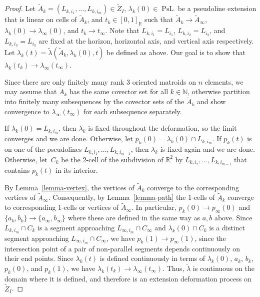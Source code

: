 \documentclass[11pt]{article}
\numberwithin{equation}{section}
\theoremstyle{remark}
\let\mb\mathbb
\DeclareMathOperator{\curves}{PsL}
\begin{document}
\begin{proof}
Let $\tilde A_k = (L_{k,i_1},\dots,L_{k,i_m}) \in \tilde Z_{I}$, $\lambda_k(0) \in \curves$ be a pseudoline extension that is linear on cells of $\tilde A_k$, and $t_k \in [0,1]_\mb{R}$ such that $\tilde A_k \to \tilde A_\infty$, $\lambda_k(0) \to \lambda_\infty(0)$, and $t_k \to t_\infty$.
Note that $L_{k,i_1} = L_{i_1}$, $L_{k,i_2} = L_{i_2}$, and $L_{k,i_3} = L_{i_3}$ are fixed at the horizon, horizontal axis, and vertical axis respectively.
Let $\lambda_k(t) = \tilde \lambda(\tilde A_k,\lambda_k(0),t)$ be defined as above.
Our goal is to show that $\lambda_k(t_k) \to \lambda_\infty(t_\infty)$.

Since there are only finitely many rank $3$ oriented matroids on $n$ elements, we may assume that $\tilde A_k$ has the same covector set for all $k \in \mb{N}$, otherwise partition into finitely many subsequences by the covector sets of the $\tilde A_k$ and show convergence to $\lambda_\infty(t_\infty)$ for each subsequence separately.

If $\lambda_k(0) = L_{k,i_m}$, then $\lambda_k$ is fixed throughout the deformation, so the limit converges and we are done.
Otherwise, let $p_k(0) = \lambda_k(0) \cap L_{k,i_m}$.
If $p_{k}(t)$ is on one of the pseudolines $L_{k,i_1},\dots,L_{k,i_{m-1}}$, then $\lambda_k$ is fixed again and we are done.
Otherwise, let~$C_k$ be the $2$-cell of the subdivision of $\mb{R}^2$ by $L_{k,i_2},\dots,L_{k,i_{m-1}}$ that contains $p_{k}(t)$ in its interior.

By Lemma~\ref{lemma-vertex}, the vertices of $\tilde A_k$ converge to the corresponding vertices of $\tilde A_\infty$.
Consequently, by Lemma~\ref{lemma-path} the 1-cells of $\tilde A_k$ converge to corresponding 1-cells or vertices of $\tilde A_\infty$.
In particular, $p_k(0) \to p_\infty(0)$ and $\{a_k,b_k\} \to \{a_\infty,b_\infty\}$ where these are defined in the same way as $a,b$ above.
Since $L_{k,i_m} \cap C_k$ is a segment approaching $L_{\infty,i_m} \cap C_\infty$ and $\lambda_k(0) \cap C_k$ is a distinct segment approaching $L_{\infty,i_m} \cap C_\infty$, we have $p_k(1) \to p_\infty(1)$, since the intersection point of a pair of non-parallel segments depends continuously on their end points.
Since $\lambda_k(t)$ is defined continuously in terms of $\lambda_k(0)$, $a_k$, $b_k$, $p_k(0)$, and $p_k(1)$, we have $\lambda_k(t_k) \to \lambda_\infty(t_\infty)$.
Thus, $\tilde \lambda$ is continuous on the domain where it is defined, and therefore is an extension deformation process on~$\tilde Z_I$.
\end{proof}
\end{document}
